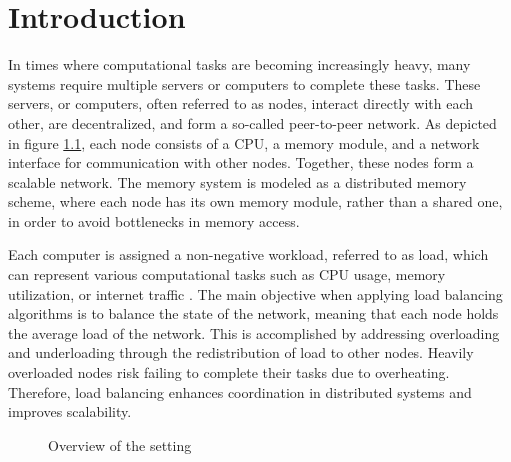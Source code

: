 \chapter{Introduction}\label{chap:introduction}
In times where computational tasks are becoming increasingly heavy, many systems require multiple servers or computers to complete these tasks. These servers, or computers, often referred to as nodes, interact directly with each other, are decentralized, and form a so-called peer-to-peer network. As depicted in figure \ref{fig:setting}, each node consists of a CPU, a memory module, and a network interface for communication with other nodes. Together, these nodes form a scalable network. The memory system is modeled as a distributed memory scheme, where each node has its own memory module, rather than a shared one, in order to avoid bottlenecks in memory access. \cite{ChengzhongFrancis}

Each computer is assigned a non-negative workload, referred to as load, which can represent various computational tasks such as CPU usage, memory utilization, or internet traffic \cite{Dinitz2023DAB}. The main objective when applying load balancing algorithms is to balance the state of the network, meaning that each node holds the average load of the network. This is accomplished by addressing overloading and underloading through the redistribution of load to other nodes. Heavily overloaded nodes risk failing to complete their tasks due to overheating. Therefore, load balancing enhances coordination in distributed systems and improves scalability.

\begin{figure}[]
    \centering
    \caption{Overview of the setting}
    \label{fig:setting}
\end{figure}

